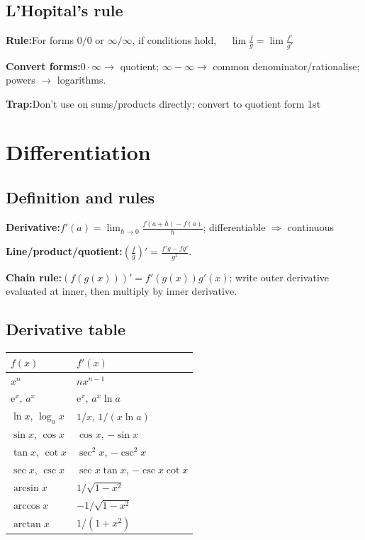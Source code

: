 \documentclass[10pt]{article}
\newcommand{\e}{\mathrm e}
\newenvironment{cheatitems}{\par\vspace{-2pt}}{\par\vspace{-2pt}}
\newcommand{\cheatrow}[2]{%
  \par\noindent\textbf{#1:}\nobreak\hspace{0.25em}#2\par
}
\begin{document}
\begin{multicols}{3}
\subsection*{L'Hopital's rule}
\begin{cheatitems}
\cheatrow{Rule}{For forms $0/0$ or $\infty/\infty$, if conditions hold, $\displaystyle \quad \lim\frac{f}{g}=\lim\frac{f'}{g'}$}
\vspace{-5pt}
\cheatrow{Convert forms}{$0\cdot\infty\to$ quotient; $\infty-\infty\to$ common denominator/rationalise; powers $\to$ logarithms.}
\cheatrow{Trap}{Don't use on sums/products directly; convert to quotient form 1st}
\end{cheatitems}

\section*{Differentiation}

\subsection*{Definition and rules}
\begin{cheatitems}
\cheatrow{Derivative}{$f'(a)=\displaystyle\lim_{h\to0}\frac{f(a+h)-f(a)}{h}$; differentiable $\Rightarrow$ continuous}
\vspace{-5pt}
\cheatrow{Line/product/quotient}{$\left(\frac fg\right)'=\frac{f'g-fg'}{g^2}$.}
\cheatrow{Chain rule}{$(f(g(x)))'=f'(g(x))g'(x)$; write outer derivative evaluated at inner, then multiply by inner derivative.}
\end{cheatitems}

\subsection*{Derivative table}
\begin{tabular}{@{}L{0.34\columnwidth}L{0.58\columnwidth}@{}}
\toprule
\textbf{$f(x)$} & \textbf{$f'(x)$}\tabularnewline
\midrule
$x^n$ & $nx^{n-1}$\tabularnewline
$\e^x$, $a^x$ & $\e^x$, $a^x\ln a$\tabularnewline
$\ln x$, $\log_a x$ & $1/x$, $1/(x\ln a)$\tabularnewline
$\sin x$, $\cos x$ & $\cos x$, $-\sin x$\tabularnewline
$\tan x$, $\cot x$ & $\sec^2x$, $-\csc^2x$\tabularnewline
$\sec x$, $\csc x$ & $\sec x\tan x$, $-\csc x\cot x$\tabularnewline
$\arcsin x$ & $1/\sqrt{1-x^2}$\tabularnewline
$\arccos x$ & $-1/\sqrt{1-x^2}$\tabularnewline
$\arctan x$ & $1/(1+x^2)$\tabularnewline
\bottomrule
\end{tabular}


\end{multicols}
\end{document}
